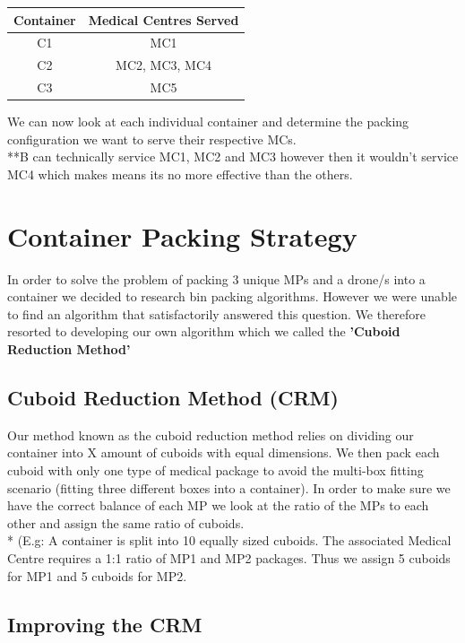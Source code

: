\documentclass[a4paper,12pt]{article}
\begin{document}
\begin{center}
\begin{tabular}{ |c|c| }
 \hline
 Container & Medical Centres Served \\\hline
  C1 & MC1 \\
  C2 & MC2, MC3, MC4  \\
  C3 & MC5 \\
 \hline
\end{tabular}
\end{center}

We can now look at each individual container and determine the packing configuration we want to serve their respective MCs.
\\**B can technically service MC1, MC2 and MC3 however then it wouldn't service MC4 which makes means its no more effective than the others.
\section{Container Packing Strategy}
In order to solve the problem of packing 3 unique MPs and a drone/s into a container we decided to research bin packing algorithms.
However we were unable to find an algorithm that satisfactorily answered this question.
We therefore resorted to developing our own algorithm which we called the \bf{'Cuboid Reduction Method'} 
\subsection{Cuboid Reduction Method (CRM)}
Our method known as the cuboid reduction method relies on dividing our container into X amount of cuboids with equal dimensions. We then pack each cuboid with only one
type of medical package to avoid the multi-box fitting scenario (fitting three different boxes into a container). In order to make sure we have the correct balance of each MP we
look at the ratio of the MPs to each other and assign the same ratio of cuboids.\\*
(E.g: A container is split into 10 equally sized cuboids. The associated Medical Centre requires a 1:1 ratio of MP1 and MP2 packages. Thus we assign 5 cuboids for MP1 and 5 cuboids for MP2.

\subsection{Improving the CRM}
\end{document}
